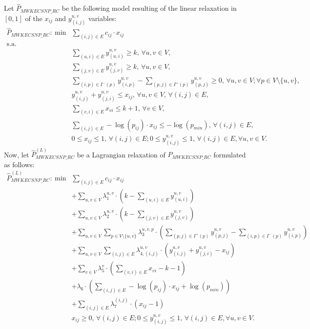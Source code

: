 Let $\hat{P}_{MWKECSNP\_RC}$ be the following model resulting of
the linear relaxation in $[0,1]$ of the $x_{ij}$ and $y_{(i,j)}^{u,v}$ variables:
\begin{align}
 \hat{P}_{MWKECSNP\_RC}:~ \mathrm{min} &  \sum_{(i,j)\in E} c_{ij}\cdot x_{ij}   \nonumber\\
 \mathrm{s.a.} & \nonumber\\
 &                  \sum_{(u,i)\in E} y_{(u,i)}^{u,v}\geq k,\, \forall u,v\in V, & \nonumber &\\
 &                  \sum_{(j,v)\in E} y_{(j,v)}^{u,v}\geq k,\, \forall u,v\in V, & \nonumber &\\
 &                  \sum_{(i,p)\in I^{-}(p)} y_{(i,p)}^{u,v}-\sum_{(p,j)\in I^{+}(p)} y_{(p,j)}^{u,v} \geq 0,\, \forall u,v\in V; \forall p\in V\setminus \{u,v\},  & \nonumber &\\
 &                   y_{(i,j)}^{u,v}+y_{(j,i)}^{u,v}\leq x_{ij},\, \forall u,v\in V,\, \forall (i,j)\in E,  & \nonumber &\\
 &                  \sum_{(v,i)\in E} x_{vi}\leq k+1,\, \forall v\in V,  & \nonumber &\\
 &                  \sum_{(i,j)\in E} -\log(p_{ij})\cdot x_{ij}\leq -\log(p_{min}),\, \forall (i,j)\in E,  & \nonumber &\\
 &                  0\leq x_{ij}\leq 1 ,\, \forall (i,j)\in E; 0\leq y_{(i,j)}^{u,v}\leq 1,\, \forall (i,j)\in E, \forall u,v\in V.   & \nonumber &
\end{align}
Now, let $\hat{P}^{(L)}_{MWKECSNP\_RC}$ be a Lagrangian relaxation
of $\hat{P}_{MWKECSNP\_RC}$ formulated as follows:
\begin{align}
 \hat{P}^{(L)}_{MWKECSNP\_RC}:~ \mathrm{min} &  \sum_{(i,j)\in E} c_{ij}\cdot x_{ij}   \nonumber\\
 &                  + \sum_{u,v\in V} \lambda^{u,v}_{1}\cdot \left(k-\sum_{(u,i)\in E} y_{(u,i)}^{u,v}\right) & \nonumber &\\
 &                  + \sum_{u,v\in V} \lambda^{u,v}_{2}\cdot \left(k-\sum_{(j,v)\in E} y_{(j,v)}^{u,v}\right) & \nonumber &\\
 &                  + \sum_{u,v\in V} \sum_{p\in V\setminus \{u,v\}} \lambda^{u,v,p}_{3}\cdot \left(\sum_{(p,j)\in I^{+}(p)} y_{(p,j)}^{u,v}-\sum_{(i,p)\in I^{-}(p)} y_{(i,p)}^{u,v}\right) & \nonumber &\\
 &                  + \sum_{u,v\in V} \sum_{(i,j)\in E} \lambda^{u,v}_{4,(i,j)}\cdot \left(y_{(i,j)}^{u,v}+y_{(j,i)}^{u,v}-x_{ij}\right) & \nonumber &\\
 &                  + \sum_{v\in V} \lambda^{v}_{5}\cdot \left(\sum_{(v,i)\in E} x_{vi}-k-1\right)  & \nonumber &\\
 &                  + \lambda_{6}\cdot \left(\sum_{(i,j)\in E} -\log(p_{ij})\cdot x_{ij}+\log(p_{min})\right)  & \nonumber &\\
 &                  + \sum_{(i,j)\in E} \lambda^{(i,j)}_{7}\cdot \left(x_{ij}-1\right)  & \nonumber &\\
 &                  x_{ij}\geq 0,\, \forall (i,j)\in E; 0\leq y_{(i,j)}^{u,v}\leq 1,\, \forall (i,j)\in E, \forall u,v\in V.   & \nonumber &
\end{align}

